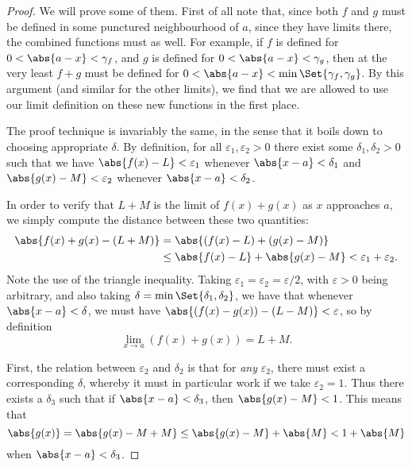\begin{proof}
	We will prove some of them.
	First of all note that, since both $f$ and $g$ must be defined in some punctured neighbourhood of $a$, since they have limits there, the combined functions must as well.
	For example, if $f$ is defined for $0 < \abs{a - x} < \gamma_f$, and $g$ is defined for $0 < \abs{a - x} < \gamma_g$, then at the very least $f + g$ must be defined for $0 < \abs{a - x} < \min\Set{\gamma_f, \gamma_g}$.
	By this argument (and similar for the other limits), we find that we are allowed to use our limit definition on these new functions in the first place.

	The proof technique is invariably the same, in the sense that it boils down to choosing appropriate $\delta$.
	By definition, for all $\varepsilon_1, \varepsilon_2 > 0$ there exist some $\delta_1, \delta_2 > 0$ such that we have $\abs{f(x) - L} < \varepsilon_1$ whenever $\abs{x - a} < \delta_1$ and $\abs{g(x) - M} < \varepsilon_2$ whenever $\abs{x - a} < \delta_2$.

	 In order to verify that $L + M$ is the limit of $f(x) + g(x)$ as $x$ approaches $a$, we simply compute the distance between these two quantities:
	\begin{align*}
		\abs{f(x) + g(x) - (L + M)} & = \abs{(f(x) - L) + (g(x) - M)}                                       \\
		                            & \leq \abs{f(x) - L} + \abs{g(x) - M} < \varepsilon_1 + \varepsilon_2.
	\end{align*}
	Note the use of the triangle inequality.
	Taking $\varepsilon_1 = \varepsilon_2 = \varepsilon / 2$, with $\varepsilon > 0$ being arbitrary, and also taking $\delta = \min\Set{\delta_1, \delta_2}$, we have that whenever $\abs{x - a} < \delta$, we must have $\abs{(f(x) - g(x)) - (L - M)} < \varepsilon$, so by definition
	\[
		\lim_{x \to a} (f(x) + g(x)) = L + M.
	\]

	 First, the relation between $\varepsilon_2$ and $\delta_2$ is that for \emph{any} $\varepsilon_2$, there must exist a corresponding $\delta$, whereby it must in particular work if we take $\varepsilon_2 = 1$.
	Thus there exists a $\delta_3$ such that if $\abs{x - a} < \delta_3$, then $\abs{g(x) - M} < 1$.
	This means that
	\[
		\abs{g(x)} = \abs{g(x) - M + M} \leq \abs{g(x) - M} + \abs{M} < 1 + \abs{M}
	\]
	when $\abs{x - a} < \delta_3$.


\end{proof}
